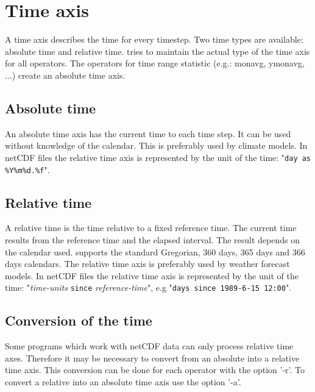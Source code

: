 \section{Time axis}

A time axis describes the time for every timestep.
Two time types are available: absolute time and relative time.
\CDO tries to maintain the actual type of the time axis for all operators.
The operators for time range statistic (e.g.: monavg, ymonavg, ...)
create an absolute time axis.

\subsection{Absolute time}

An absolute time axis has the current time to each time step.
It can be used without knowledge of the calendar.
This is preferably used by climate models.
In netCDF files the relative time axis is represented by the 
unit of the time: {"{\tt day as \%Y\%m\%d.\%f}"}.

\subsection{Relative time}

A relative time is the time relative to a fixed reference time.
The current time results from the reference time and the elapsed interval.
The result depends on the calendar used.
\CDO supports the standard Gregorian, 360 days, 365 days and 366 days calendars.
The relative time axis is preferably used by weather forecast models.
In netCDF files the relative time axis is represented by the 
unit of the time: {"{\it time-units} {\tt since} {\it reference-time}"},
e.g "{\tt days since 1989-6-15 12:00}".

\subsection{Conversion of the time}

Some programs which work with netCDF data can only process relative time axes.
Therefore it may be necessary to convert from an absolute into a relative time axis.
This conversion can be done for each operator with the \CDO option '-r'.
To convert a relative into an absolute time axis use the \CDO option '-a'.
